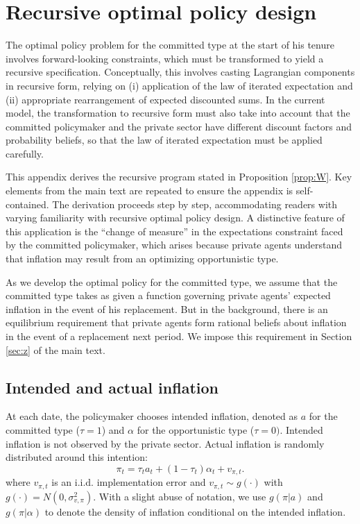 \documentclass[12pt,letter,leqno]{article}
\theoremstyle{asn}
\theoremstyle{lem}
\theoremstyle{slem}
\theoremstyle{prop}
\theoremstyle{appprop}
\theoremstyle{rem}
\theoremstyle{defn}
\begin{document}
\section{Recursive optimal policy design}\label{appsec:recursive}
 \renewcommand{\theequation}{A%
\arabic{equation}}

The optimal policy problem for the committed type at the start of his tenure involves forward-looking constraints, which must
be transformed to yield a recursive specification. Conceptually, this
involves casting Lagrangian components in recursive form, relying on (i) application of the law of iterated expectation and
(ii) appropriate rearrangement of expected discounted sums.
In the current model, the transformation to recursive form must also take into account that the committed policymaker and the private sector have different discount
factors and probability beliefs, so that the law of iterated expectation must
be applied carefully.

This appendix derives the recursive program stated in Proposition \ref{prop:W}. Key elements from the main text are repeated to ensure the appendix is self-contained. The derivation proceeds step by step, accommodating readers with varying familiarity with recursive optimal policy design. A distinctive feature of this application is the ``change of measure” in the expectations constraint faced by the committed policymaker, which arises because private agents  understand that inflation may result from an optimizing opportunistic type.  

As we develop the optimal policy for the committed type, we assume that the committed type takes as given a function governing private agents' expected inflation in the event of his replacement. But in the background, there is an equilibrium requirement that private agents form rational beliefs about inflation in the event of a replacement next period. We impose this requirement in Section \ref{sec:z} of the main text.

\subsection{Intended and actual inflation}
\label{appsec:recursive1}

At each date, the policymaker chooses intended inflation, denoted as $a$
for the committed type ($\tau=1$) and $\alpha $ for the opportunistic type ($%
\tau=0)$. Intended inflation is not observed by the private sector. Actual inflation is randomly distributed around this intention:
\begin{equation}\label{app:pi}
    \pi_t=\tau_t a_t + (1-\tau_t) \alpha_t + v_{\pi,t}.
\end{equation}
where $v_{\pi,t}$ is an i.i.d. implementation error and  $v_{\pi,t} \sim g(\cdot)$ with $g(\cdot) = N(0,\sigma_{v,\pi}^2)$. With a slight abuse of notation, we use $g(\pi|a)$ and $g(\pi|\alpha)$ to denote the density of inflation conditional on the intended inflation.
\end{document}

